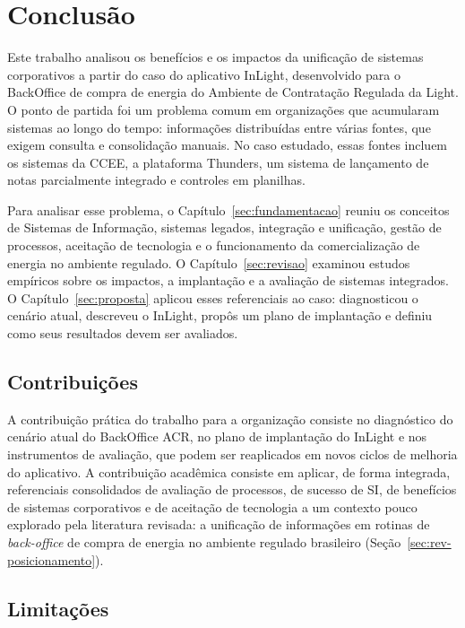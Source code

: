 \chapter{Conclusão}
\label{chp:conclusao}

Este trabalho analisou os benefícios e os impactos da unificação de sistemas corporativos a partir do caso do aplicativo InLight, desenvolvido para o BackOffice de compra de energia do Ambiente de Contratação Regulada da Light. O ponto de partida foi um problema comum em organizações que acumularam sistemas ao longo do tempo: informações distribuídas entre várias fontes, que exigem consulta e consolidação manuais. No caso estudado, essas fontes incluem os sistemas da CCEE, a plataforma Thunders, um sistema de lançamento de notas parcialmente integrado e controles em planilhas.

Para analisar esse problema, o Capítulo~\ref{sec:fundamentacao} reuniu os conceitos de Sistemas de Informação, sistemas legados, integração e unificação, gestão de processos, aceitação de tecnologia e o funcionamento da comercialização de energia no ambiente regulado. O Capítulo~\ref{sec:revisao} examinou estudos empíricos sobre os impactos, a implantação e a avaliação de sistemas integrados. O Capítulo~\ref{sec:proposta} aplicou esses referenciais ao caso: diagnosticou o cenário atual, descreveu o InLight, propôs um plano de implantação e definiu como seus resultados devem ser avaliados.

\section{Contribuições}

A contribuição prática do trabalho para a organização consiste no diagnóstico do cenário atual do BackOffice ACR, no plano de implantação do InLight e nos instrumentos de avaliação, que podem ser reaplicados em novos ciclos de melhoria do aplicativo. A contribuição acadêmica consiste em aplicar, de forma integrada, referenciais consolidados de avaliação de processos, de sucesso de SI, de benefícios de sistemas corporativos e de aceitação de tecnologia a um contexto pouco explorado pela literatura revisada: a unificação de informações em rotinas de \textit{back-office} de compra de energia no ambiente regulado brasileiro (Seção~\ref{sec:rev-posicionamento}).

\section{Limitações}

